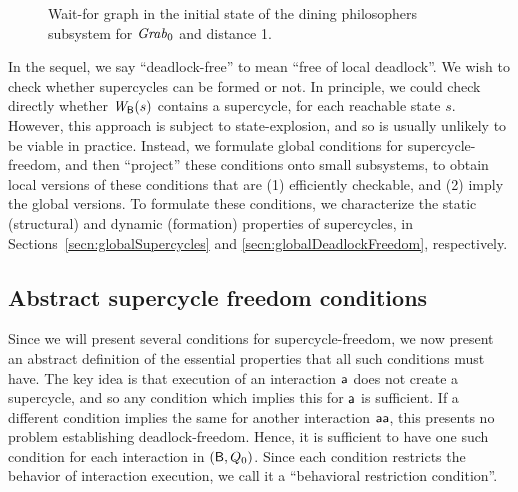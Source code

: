 \begin{figure*}[ht]
  \begin{center}
   \scalebox{0.4}{}
   \caption{Wait-for graph in the initial state of the dining philosophers subsystem for $\mathit{Grab}_0$ and distance 1.}
   \label{fig:sc-local-dining}
  \end{center}
\end{figure*}






In the sequel, we say ``deadlock-free'' to mean ``free of local deadlock''.
%
We wish to check whether supercycles can be formed or not.
In principle, we could check directly whether $\mathit{W}_{\mathsf{B}}({s})$ contains a supercycle, for each
reachable state $s$. However, this approach is subject to state-explosion, and so is usually
unlikely to be viable in practice.  Instead, we formulate global conditions for supercycle-freedom,
and then ``project'' these conditions onto small subsystems, to obtain local versions of these
conditions that are (1) efficiently checkable, and (2) imply the global versions.
To formulate these conditions, we characterize the static (structural) and dynamic
(formation) properties of supercycles, in Sections~\ref{secn:globalSupercycles} and \ref{secn:globalDeadlockFreedom}, respectively.




\subsection{Abstract supercycle freedom conditions}
\label{secn:abstract-scfree-conditions}

Since we will present several conditions for supercycle-freedom, we now present an abstract
definition of the essential properties that all such conditions must have.  The key idea is that
execution of an interaction $\mathsf{a}$ does not create a supercycle, and so any condition which implies 
this for $\mathsf{a}$ is sufficient. If a different condition implies the same for another interaction
$\mathsf{aa}$, this presents no problem \wrt establishing deadlock-freedom. Hence, it is sufficient to
have one such condition for each interaction in  $(\mathsf{B},Q_0)$. Since each condition restricts the
behavior of interaction execution, we call it a ``behavioral restriction condition''.


